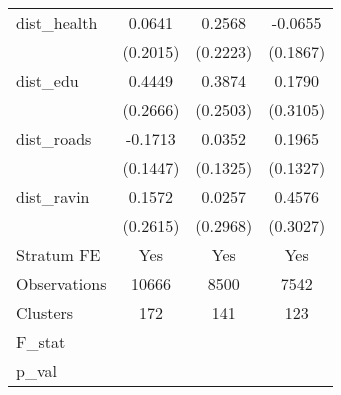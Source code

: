 {\begin{tabular}{l*{3}{c}}
dist\_health     &   0.0641         &   0.2568         &  -0.0655         \\
                & (0.2015)         & (0.2223)         & (0.1867)         \\
dist\_edu        &   0.4449\sym{*}  &   0.3874         &   0.1790         \\
                & (0.2666)         & (0.2503)         & (0.3105)         \\
dist\_roads      &  -0.1713         &   0.0352         &   0.1965         \\
                & (0.1447)         & (0.1325)         & (0.1327)         \\
dist\_ravin      &   0.1572         &   0.0257         &   0.4576         \\
                & (0.2615)         & (0.2968)         & (0.3027)         \\
Stratum FE      &      Yes         &      Yes         &      Yes         \\
\hline
Observations    &    10666         &     8500         &     7542         \\
Clusters        &      172         &      141         &      123         \\
F\_stat          &                  &                  &                  \\
p\_val           &                  &                  &                  \\
\hline\hline
\end{tabular}
}
